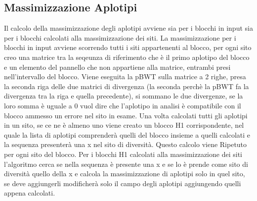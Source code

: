 \documentclass{article}
\begin{document}
\subsection{Massimizzazione Aplotipi}
Il calcolo della massimizzazione degli aplotipi avviene sia per i blocchi in input sia per i blocchi calcolati alla massimizzazione dei siti. La massimizzazione per i blocchi in input avviene scorrendo tutti i siti appartenenti al blocco, per ogni sito creo una matrice tra la seqeunza di riferimento che è il primo aplotipo del blocco e un elemento del pannello che non appartiene alla matrice, entrambi presi nell'intervallo del blocco. Viene eseguita la pBWT sulla matrice a 2 righe, presa la seconda riga delle due matrici di divergenza (la seconda perchè la pBWT fa la divergenza tra la riga e quella precedente), si sommano le due divergenze, se la loro somma è uguale a 0 vuol dire che l'aplotipo in analisi è compatibile con il blocco ammesso un errore nel sito in esame. Una volta calcolati tutti gli aplotipi in un sito, se ce ne è almeno uno viene creato un blocco H1 corrispondente, nel quale la lista di aplotipi comprenderà quelli del blocco insieme a quelli calcolati e la sequenza presenterà una x nel sito di diversità. Questo calcolo viene Ripetuto per ogni sito del blocco. Per i blocchi H1 calcolati alla massimizzazione dei siti l'algoritmo cerca se nella sequenza è presente una x e se lo è prende come sito di diversità quello della x e calcola la massimizzazione di aplotipi solo in quel sito, se deve aggiungerli modificherà solo il campo degli aplotipi aggiungendo quelli appena calcolati.
\end{document}
